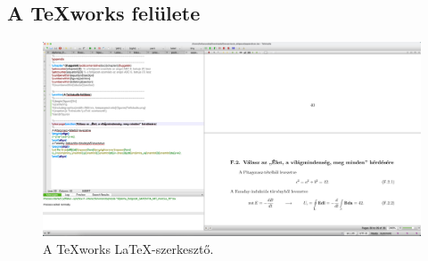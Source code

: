 \appendix
\chapter*{\fuggelek}
\setcounter{chapter}{6}  %
\setcounter{equation}{0} %

\section{A TeXworks felülete}
\begin{figure}[!ht]
\centering
\includegraphics[width=150mm, keepaspectratio]{images/texstudio}
\caption{A TeXworks \LaTeX-szerkesztő.} 
\end{figure}





